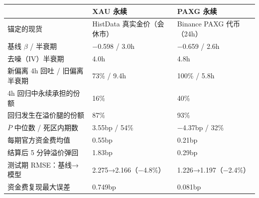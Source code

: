 \begin{tabular}{lll}
\toprule
 & XAU 永续 & PAXG 永续 \\
\midrule
锚定的现货 & HistData 真实金价（会休市） & Binance PAXG 代币（24h） \\
基线 $\beta$ / 半衰期 & −0.598 / 3.0h & −0.659 / 2.6h \\
去噪（IV）半衰期 & 4.0h & 4.8h \\
新偏离 4h 回吐 / 旧偏离半衰期 & 73\% / 9.4h & 100\% / 5.8h \\
4h 回归中永续承担的份额 & 16\% & 40\% \\
回归发生在溢价腿的份额 & 87\% & 93\% \\
$\overline{P}$ 中位数 / 死区内期数 & 3.55bp / 54\% & −4.37bp / 32\% \\
每期官方资金费均值 & 0.55bp & 0.21bp \\
结算后 5 分钟溢价弹回 & 1.83bp & 0.29bp \\
测试期 RMSE：基线→模型 & 2.275→2.166（−4.8\%） & 1.226→1.197（−2.4\%） \\
资金费复现最大误差 & 0.749bp & 0.081bp \\
\bottomrule
\end{tabular}
